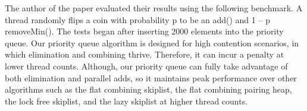 \documentclass[10pt]{asme2ej}
\begin{document}
The author of the paper evaluated their results using the following benchmark. A thread randomly flips a coin with probability p to be an add() and 1 – p removeMin(). The tests began after inserting 2000 elements into the priority queue. Our priority queue algorithm is designed for high contention scenarios, in which elimination and combining thrive. Therefore, it can incur a penalty at lower thread counts. Although, our priority queue can fully take advantage of both elimination and parallel adds, so it maintains peak performance over other algorithms such as the flat combining skiplist, the flat combining pairing heap, the lock free skiplist, and the lazy skiplist at higher thread counts.




\end{document}
